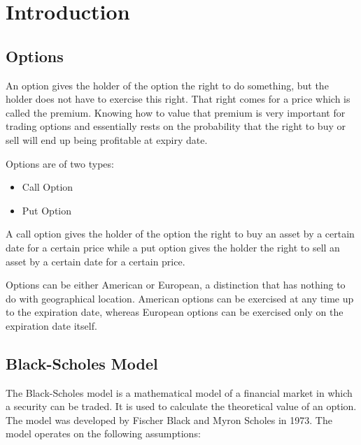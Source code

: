 
\chapter{Introduction} %

\label{Chapter1} %



\section{Options}
An option gives the holder of the option the right to do something, but the holder does not have to exercise this right. That right comes for a price which is called the premium. Knowing how to value that premium is very important for trading options and essentially rests on the probability that the right to buy or sell will end up being profitable at expiry date. 

Options are of two types:
\begin{itemize}[noitemsep,topsep=0pt]
    \item Call Option
    \item Put Option
\end{itemize}

A call option gives the holder of the option the right to buy an asset by a certain date for a certain price while a put option gives the holder the right to sell an asset by a certain date for a certain price.

Options can be either American or European, a distinction that has nothing to do with geographical location. American options can be exercised at any time up to the expiration date, whereas European options can be exercised only on the expiration date itself.

\section{Black-Scholes Model}

The Black-Scholes model\cite{RePEc:ucp:jpolec:v:81:y:1973:i:3:p:637-54} is a mathematical model of a financial market in which a security can be traded. It is used to calculate the theoretical value of an option. The model was developed by Fischer Black and Myron Scholes in 1973. The model operates on the following assumptions:

